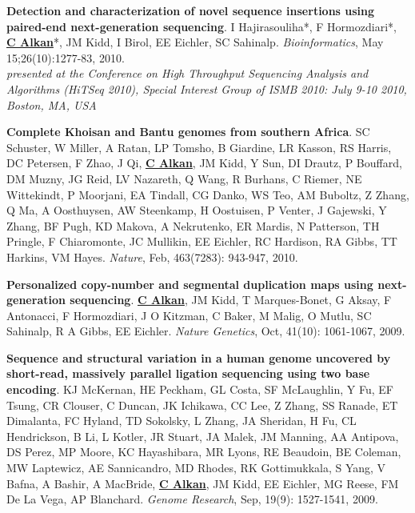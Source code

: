 \vspace{-.2cm}
{\bf Detection and characterization of novel sequence insertions using paired-end next-generation sequencing}.
 I Hajirasouliha*, F Hormozdiari*, {\bf {\underline{C Alkan}}}*, JM Kidd, I Birol, EE Eichler,
 SC Sahinalp.
{\em Bioinformatics}, May 15;26(10):1277-83, 2010. \\
\hspace*{1cm} {\footnotesize {\em presented at the Conference on High Throughput Sequencing Analysis and Algorithms (HiTSeq 2010), 
    Special Interest Group of ISMB 2010: July 9-10 2010, Boston, MA, USA}}


\vspace{-.2cm}
{\bf Complete Khoisan and Bantu genomes from southern Africa}.
 SC Schuster, W Miller, A Ratan, LP Tomsho, B Giardine, LR Kasson, RS
 Harris, DC Petersen, F Zhao, J Qi, {\bf \underline{C Alkan}}, JM Kidd, Y Sun, DI Drautz, 
P Bouffard, DM Muzny, JG Reid, LV Nazareth, Q Wang, R Burhans, C Riemer, 
NE Wittekindt, P Moorjani, EA Tindall, CG Danko, WS Teo, AM Buboltz, 
Z Zhang, Q Ma, A Oosthuysen, AW Steenkamp, H Oostuisen, P Venter, J 
Gajewski, Y Zhang, BF Pugh, KD Makova, A Nekrutenko, ER Mardis, N Patterson, 
TH Pringle, F Chiaromonte, JC Mullikin, EE Eichler, RC Hardison, RA Gibbs, TT 
Harkins, VM Hayes. 
{\em Nature}, Feb, 463(7283): 943-947, 2010.

\vspace{-.2cm}
{\bf Personalized copy-number and segmental duplication maps using next-generation sequencing}.
{\bf {\underline{C Alkan}}}, JM Kidd, T Marques-Bonet, G Aksay, F Antonacci, F Hormozdiari, J O Kitzman, 
C Baker, M Malig, O Mutlu, SC Sahinalp, R A Gibbs, EE Eichler.  
{\em Nature Genetics},  Oct, 41(10): 1061-1067, 2009.\\


\vspace{-.2cm}
{\bf Sequence and structural variation in a human genome uncovered by short-read, massively parallel ligation sequencing using two base encoding}.
KJ McKernan, HE Peckham, GL Costa, SF McLaughlin, Y Fu, EF Tsung, CR Clouser, C Duncan, JK Ichikawa, CC Lee, Z Zhang, 
SS Ranade, ET Dimalanta,  FC Hyland, TD Sokolsky, L Zhang, JA Sheridan, H Fu, CL Hendrickson, B Li, L Kotler, JR Stuart, 
JA Malek, JM Manning, AA Antipova, DS Perez, MP Moore, KC Hayashibara, MR Lyons, RE Beaudoin, BE Coleman, MW Laptewicz, 
AE Sannicandro, MD Rhodes, RK Gottimukkala, S Yang, V Bafna, A Bashir, A MacBride, {\bf \underline{C Alkan}}, JM Kidd, EE Eichler, 
MG Reese, FM De La Vega, AP Blanchard. 
{\em Genome Research}, Sep, 19(9): 1527-1541, 2009.


